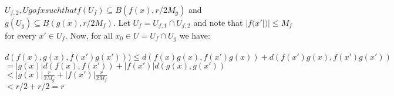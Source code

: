\documentclass{article}
\newcommand\tab[1][1cm]{\hspace*{#1}}
\begin{document}
\begin{enumerate}[label=(\alph*)]
		\(U_{f,2},Ug of x such that f(U_{f}) \subseteq B(f(x),r/2M_{g})\) and \(g(U_{g}) \subseteq B(g(x),r/2M_{f})\). 
		Let \(U_{f} = U_{f,1} \cap U_{f,2}\) and note that \(|f(x'|)| ≤ M_{f}\) for every \(x' \in U_{f}\). 
		Now, for all \(x_{0} \in U = U_{f} \cap U_{g}\) we have: \\\\
		\tab[2cm] \(d(f(x),g(x), f(x')g(x'))) \le d(f(x)g(x), f(x')g(x)) + d(f(x')g(x), f(x')g(x'))\)\\
		\tab[6cm] \( = |g(x)|d(f(x),f(x')) + |f(x')|d(g(x),g(x'))\)\\
		\tab[6cm] \( < |g(x)| \frac{r}{2M_{g}} + |f(x')|\frac{r}{2M_{f}}\) \\
		\tab[6cm] \( < r/2 + r/2 = r\)
\end{enumerate}
\end{document}
